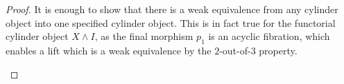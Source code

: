 \documentclass[../thesis.tex]{subfiles}
\begin{document}
            \begin{proof}
                It is enough to show that there is a weak equivalence from any cylinder object into one specified cylinder object. This is in fact true for the functorial cylinder object $X\wedge I$, as the final morphism $p_1$ is an acyclic fibration, which enables a lift which is a weak equivalence by the $2$-out-of-$3$ property.

                \begin{center}
                \end{center}
            \end{proof}
\end{document}

